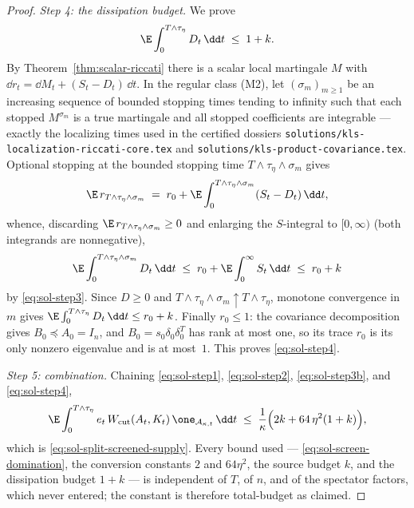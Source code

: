 \documentclass[../main.tex]{subfiles}
\begin{document}
\begin{proof}
\medskip
\emph{Step 4: the dissipation budget.}
We prove
\begin{equation}
\label{eq:sol-step4}
  \E\int_0^{T\wedge\tau_\eta}D_t\,\dd t\;\le\;1+k .
\end{equation}
By Theorem~\ref{thm:scalar-riccati} there is a scalar local martingale $M$ with
$\dd r_t=\dd M_t+(S_t-D_t)\,\dd t$.  In the regular class (M2), let
$(\sigma_m)_{m\ge1}$ be an increasing sequence of bounded stopping times tending to infinity
such that each stopped $M^{\sigma_m}$ is a true martingale and all stopped coefficients are
integrable — exactly the localizing times used in the certified dossiers
\texttt{solutions/kls-localization-riccati-core.tex} and
\texttt{solutions/kls-product-covariance.tex}.  Optional stopping at the bounded stopping
time $T\wedge\tau_\eta\wedge\sigma_m$ gives
\[
  \E\, r_{T\wedge\tau_\eta\wedge\sigma_m}
  \;=\;r_0+\E\int_0^{T\wedge\tau_\eta\wedge\sigma_m}(S_t-D_t)\,\dd t ,
\]
whence, discarding $\E\,r_{T\wedge\tau_\eta\wedge\sigma_m}\ge0$ and enlarging the
$S$-integral to $[0,\infty)$ (both integrands are nonnegative),
\[
  \E\int_0^{T\wedge\tau_\eta\wedge\sigma_m}D_t\,\dd t
  \;\le\;r_0+\E\int_0^\infty S_t\,\dd t
  \;\le\;r_0+k
\]
by \eqref{eq:sol-step3}.  Since $D\ge0$ and
$T\wedge\tau_\eta\wedge\sigma_m\uparrow T\wedge\tau_\eta$, monotone convergence in $m$ gives
$\E\int_0^{T\wedge\tau_\eta}D_t\,\dd t\le r_0+k$.  Finally $r_0\le1$: the covariance
decomposition gives $B_0\preceq A_0=I_n$, and $B_0=s_0\delta_0\delta_0^T$ has rank at most
one, so its trace $r_0$ is its only nonzero eigenvalue and is at most~$1$.  This proves
\eqref{eq:sol-step4}.

\medskip
\emph{Step 5: combination.}
Chaining \eqref{eq:sol-step1}, \eqref{eq:sol-step2}, \eqref{eq:sol-step3b}, and
\eqref{eq:sol-step4},
\[
  \E\int_0^{T\wedge\tau_\eta}
    e_t\,W_{\rm cut}(A_t,K_t)\,\one_{\mathcal A_{\kappa,t}}\,\dd t
  \;\le\;\frac1\kappa\Bigl(2k+64\,\eta^2(1+k)\Bigr),
\]
which is \eqref{eq:sol-split-screened-supply}.  Every bound used —
\eqref{eq:sol-screen-domination}, the conversion constants $2$ and $64\eta^2$, the source
budget $k$, and the dissipation budget $1+k$ — is independent of $T$, of $n$, and of the
spectator factors, which never entered; the constant is therefore total-budget as claimed.
\end{proof}
\end{document}
